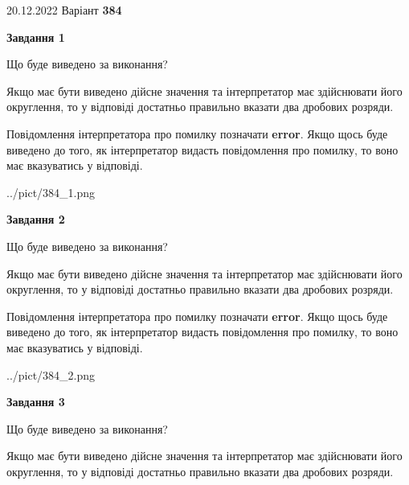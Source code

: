 \documentclass[12pt, ukrainian]{article}
\begin{document}
{20.12.2022 Варіант \No \textbf { 384 }\par}
{
\begin {Large}

{\begin {center}\textbf{Завдання 1}\end {center}}\par
Що буде виведено за виконання? \par

Якщо має бути виведено дійсне значення та інтерпретатор має здійснювати його округлення, 
то у відповіді достатньо правильно вказати два дробових розряди.

Повідомлення інтерпретатора про помилку позначати \textbf{error}.
Якщо щось буде виведено до того, як інтерпретатор видасть повідомлення про помилку, 
то воно має вказуватись у відповіді. \par

\begin{center}
	{../pict/384_1.png}
\end{center}
\newpage

{\begin {center}\textbf{Завдання 2}\end {center}}\par
Що буде виведено за виконання? \par

Якщо має бути виведено дійсне значення та інтерпретатор має здійснювати його округлення, 
то у відповіді достатньо правильно вказати два дробових розряди.

Повідомлення інтерпретатора про помилку позначати \textbf{error}.
Якщо щось буде виведено до того, як інтерпретатор видасть повідомлення про помилку, 
то воно має вказуватись у відповіді. \par

\begin{center}
	{../pict/384_2.png}
\end{center}
\newpage

{\begin {center}\textbf{Завдання 3}\end {center}}\par
Що буде виведено за виконання? \par

Якщо має бути виведено дійсне значення та інтерпретатор має здійснювати його округлення, 
то у відповіді достатньо правильно вказати два дробових розряди.


\end{Large}}
\end{document}
